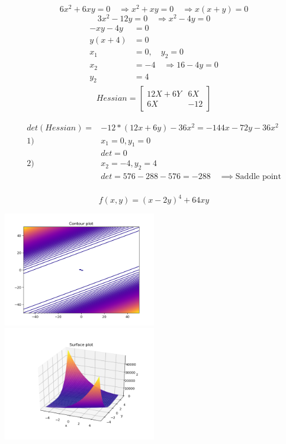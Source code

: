 \documentclass[12pt]{article}         %
\begin{document}
$$
6x^2+6xy=0 \quad\Rightarrow x^2+xy=0 \quad\Rightarrow x(x+y)=0 %
$$
$$
3x^2-12y=0 \quad\Rightarrow x^2-4y=0
$$
$$
\begin{aligned}
-xy-4y&=0\\
y(x+4)&=0\\
x_1&=0, \quad y_2=0\\
x_2&=-4 \quad\Rightarrow 16-4y=0\\
y_2&=4
\end{aligned}
$$
\begin{gather}
Hessian = 
  \begin{bmatrix}
  12 X + 6Y &
   6X\\
   6X &
   -12 
   \end{bmatrix}
    \nonumber %
\end{gather}


$$
\begin{aligned}
det(Hessian)=&-12*(12x+6y) - 36x^2= -144x-72y-36x^2\\
1)\: &x_1=0, y_1=0\\
&det=0 \\ %
2)\: &x_2=-4, y_2=4\\
&det=576-288-576=-288 \quad\implies \text{Saddle point}
\end{aligned}
$$\\

\begin{equation}
	f(x,y) = (x - 2y)^4 + 64xy
\end{equation}

\includegraphics[width=0.5\textwidth]{Figure_2}
\includegraphics[width=0.5\textwidth]{Surface_2}
\end{document}

